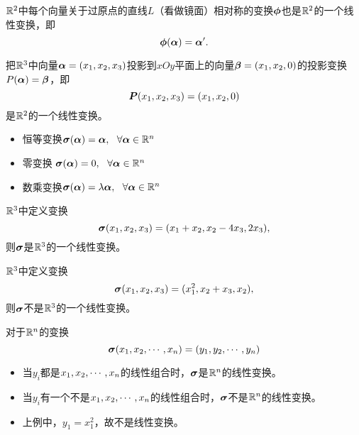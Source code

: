 \begin{frame}
  \begin{li}
    $\mathbb R^2$中每个向量关于过原点的直线$L$（看做镜面）相对称的变换$\boldsymbol{\phi}$也是$\mathbb R^2$的一个线性变换，即
    $$
    \boldsymbol{\phi}(\boldsymbol{\alpha})=\boldsymbol{\alpha}^\prime.
    $$
  \end{li}
\end{frame}

\begin{frame}
  \begin{li}[投影变换]
    把$\mathbb R^3$中向量$\boldsymbol{\alpha}=(x_1,x_2,x_3)$投影到$xOy$平面上的向量$\boldsymbol{\beta}=(x_1,x_2,0)$的投影变换$P(\boldsymbol{\alpha})=\boldsymbol{\beta}$，即
    $$
    \boldsymbol{P}(x_1,x_2,x_3)=(x_1,x_2,0)
    $$
    是$\mathbb R^2$的一个线性变换。
  \end{li}
\end{frame}

\begin{frame}
  \begin{li}
    \begin{itemize}
    \item 恒等变换$\boldsymbol{\sigma}(\boldsymbol{\alpha})=\boldsymbol{\alpha}, ~~\forall \boldsymbol{\alpha}\in\mathbb R^n$
    \item 零变换 $\boldsymbol{\sigma}(\boldsymbol{\alpha})=0, ~~\forall \boldsymbol{\alpha}\in\mathbb R^n$
    \item 数乘变换$\boldsymbol{\sigma}(\boldsymbol{\alpha})=\lambda\boldsymbol{\alpha}, ~~\forall \boldsymbol{\alpha}\in\mathbb R^n$
    \end{itemize}
  \end{li}
\end{frame}

\begin{frame}
  \begin{li}
    $\mathbb R^3$中定义变换
    $$
    \boldsymbol{\sigma}(x_1,x_2,x_3)=(x_1+x_2,x_2-4x_3,2x_3),
    $$
    则$\boldsymbol{\sigma}$是$\mathbb R^3$的一个线性变换。
  \end{li}
\end{frame}

\begin{frame}
  \begin{li}
    $\mathbb R^3$中定义变换
    $$
    \boldsymbol{\sigma}(x_1,x_2,x_3)=(x_1^2,x_2+x_3,x_2),
    $$
    则$\boldsymbol{\sigma}$不是$\mathbb R^3$的一个线性变换。
  \end{li}
\end{frame}

\begin{frame}
  对于$\mathbb R^n$的变换
  $$
  \boldsymbol{\sigma}(x_1,x_2,\cdots,x_n)=(y_1,y_2,\cdots,y_n)
  $$
  \begin{itemize}
  \item 当$y_i$都是$x_1,x_2,\cdots,x_n$的线性组合时，$\boldsymbol{\sigma}$是$\mathbb R^n$的线性变换。\\[0.1in]
  \item 当$y_i$有一个不是$x_1,x_2,\cdots,x_n$的线性组合时，$\boldsymbol{\sigma}$不是$\mathbb R^n$的线性变换。 \\[0.1in]
  \item[] 上例中，$y_1=x_1^2$，故不是线性变换。
  \end{itemize}
\end{frame}


